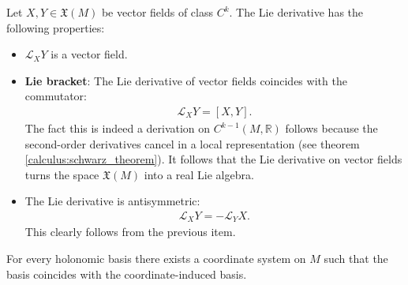     \begin{property}
        Let $X, Y\in\mathfrak{X}(M)$ be vector fields of class $C^k$. The Lie derivative has the following properties:
        \begin{itemize}
            \item $\mathcal{L}_XY$ is a vector field.
            \item \textbf{Lie bracket}: The Lie derivative of vector fields coincides with the commutator:
                \begin{gather}
                    \label{manifolds:lie_bracket}
                    \mathcal{L}_XY = [X, Y].
                \end{gather}
                The fact this is indeed a derivation on $C^{k-1}(M, \mathbb{R})$ follows because the second-order derivatives cancel in a local representation (see theorem \ref{calculus:schwarz_theorem}). It follows that the Lie derivative on vector fields turns the space $\mathfrak{X}(M)$ into a real Lie algebra.
            \item The Lie derivative is antisymmetric:
                \begin{gather}
                    \label{diff:lie_derivative_antisymmetry}
                    \mathcal{L}_XY = -\mathcal{L}_YX.
                \end{gather}
                This clearly follows from the previous item.
        \end{itemize}
    \end{property}

    \begin{property}
        For every holonomic basis there exists a coordinate system on $M$ such that the basis coincides with the coordinate-induced basis.
    \end{property}

